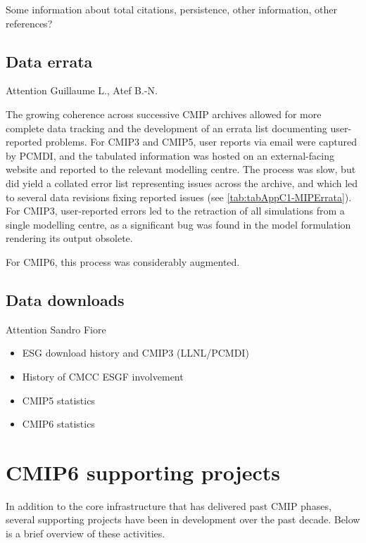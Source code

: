 \documentclass[gmd, preprint]{copernicus}
\newcommand{\mycomment}[1]{}
\def\cred#1{{\color{red}#1}}
\begin{document}
\cred{Some information about total citations, persistence, other information, other references?}
\mycomment{
https://www.wdc-climate.de/ui/statistics?type=cmip6_doi_registration
https://commons.datacite.org/repositories/8orcv25 - Master overview 6012 citations
https://www.wdc-climate.de/ords/f?p=127:2 - CMIP6 data references
https://www.wdc-climate.de/ui/cmip6?input=CMIP6.ScenarioMIP.NOAA-GFDL.GFDL-CM4.ssp585
https://www.wdc-climate.de/ui/cmip6?input=input4MIPs.CMIP6.CMIP.PCMDI
}


\subsection{Data errata}
\cred{Attention Guillaume L., Atef B.-N.}

The growing coherence across successive CMIP archives allowed for more complete data tracking and the development of an errata list documenting user-reported problems. For CMIP3 and CMIP5, user reports via email were captured by PCMDI, and the tabulated information was hosted on an external-facing website and reported to the relevant modelling centre. The process was slow, but did yield a collated error list representing issues across the archive, and which led to several data revisions fixing reported issues (see \autoref{tab:tabAppC1-MIPErrata}). For CMIP3, user-reported errors led to the retraction of all simulations from a single modelling centre, as a significant bug was found in the model formulation rendering its output obsolete.

\cred{For CMIP6, this process was considerably augmented.}


\subsection{Data downloads}
\cred{Attention Sandro Fiore
\begin{itemize}
	\item ESG download history and CMIP3 (LLNL/PCMDI)
    \item History of CMCC ESGF involvement
	\item CMIP5 statistics
	\item CMIP6 statistics
\end{itemize}
}

\section{CMIP6 supporting projects}
\label{sec:CMIP6SupportingProjects}
In addition to the core infrastructure that has delivered past CMIP phases, several supporting projects have been in development over the past decade. Below is a brief overview of these activities.
\end{document}
